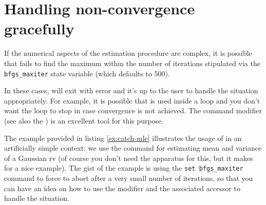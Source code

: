 
\section{Handling non-convergence gracefully}
\label{sec:mle-nonconv}

If the numerical aspects of the estimation procedure are complex, it
is possible that  fails to find the maximum within the number
of iterations stipulated via the \verb|bfgs_maxiter| state variable
(which defaults to 500).

In these cases,  will exit with error and it's up to the user
to handle the situation appropriately. For example, it is possible
that  is used inside a loop and you don't want the loop to
stop in case convergence is not achieved. The  command
modifier (see also the \GCR) is an excellent tool for this purpose.

The example provided in listing \ref{ex:catch-mle} illustrates the
usage of  in an artificially simple context: we use the
 command for estimating mean and variance of a Gaussian rv
(of course you don't need the  apparatus for this, but it
makes for a nice example). The gist of the example is using the
\verb|set bfgs_maxiter| command to force  to abort after a
very small number of iterations, so that you can have an idea on how
to use the  modifier and the associated 
accessor to handle the situation.

